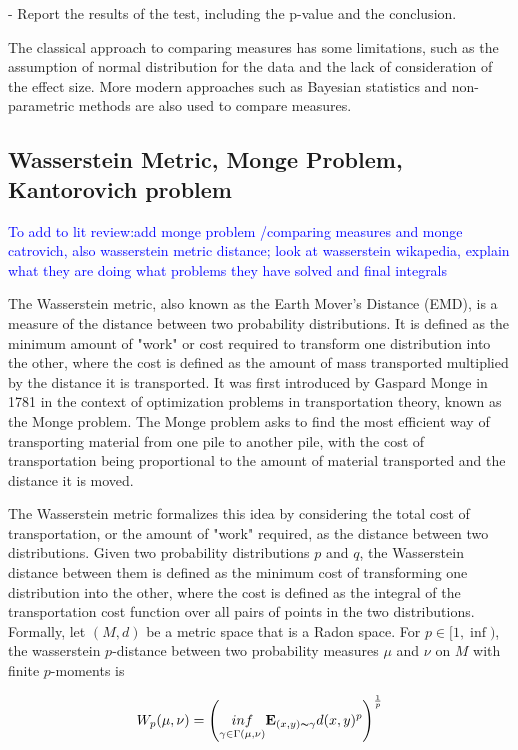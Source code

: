 \documentclass[12pt]{article} %
\theoremstyle{plain}
\begin{document}
	- Report the results of the test, including the p-value and the conclusion.
	
	The classical approach to comparing measures has some limitations, such as the assumption of normal distribution for the data and the lack of consideration of the effect size. More modern approaches such as Bayesian statistics and non-parametric methods are also used to compare measures.
	
	\subsection{Wasserstein Metric, Monge Problem, Kantorovich problem}
	\textcolor{blue}{To add to lit review:add monge problem /comparing measures and monge catrovich, also wasserstein metric distance; look at wasserstein wikapedia, explain what they are doing what problems they have solved and final integrals}
	
	The Wasserstein metric, also known as the Earth Mover's Distance (EMD), is a measure of the distance between two probability distributions. It is defined as the minimum amount of "work" or cost required to transform one distribution into the other, where the cost is defined as the amount of mass transported multiplied by the distance it is transported. It was first introduced by Gaspard Monge in 1781 in the context of optimization problems in transportation theory, known as the Monge problem. The Monge problem asks to find the most efficient way of transporting material from one pile to another pile, with the cost of transportation being proportional to the amount of material transported and the distance it is moved.
	
	The Wasserstein metric formalizes this idea by considering the total cost of transportation, or the amount of "work" required, as the distance between two distributions. Given two probability distributions $p$ and $q$, the Wasserstein distance between them is defined as the minimum cost of transforming one distribution into the other, where the cost is defined as the integral of the transportation cost function over all pairs of points in the two distributions. Formally, let $(M,d)$ be a metric space that is a Radon space. For $p \in [1, \inf)$, the wasserstein $p$-distance between two probability measures $\mu$ and $\nu$ on $M$ with finite $p$-moments is 
	
	\begin{equation}
		W_p(\mu, \nu) = \left( \underset{\gamma \in \Gamma (\mu,\nu)}{inf} \mathbf{E}_{(x,y) \thicksim \gamma} d(x,y)^p \right)^{\frac{1}{p}}
	\end{equation}
\end{document}
